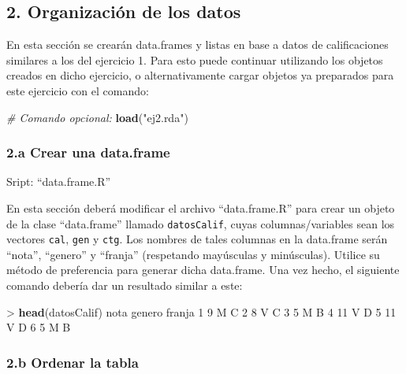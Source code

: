 \documentclass[]{article}
\newenvironment{Shaded}{}{}
\newcommand{\KeywordTok}[1]{\textcolor[rgb]{0.00,0.44,0.13}{\textbf{{#1}}}}
\newcommand{\DecValTok}[1]{\textcolor[rgb]{0.25,0.63,0.44}{{#1}}}
\newcommand{\StringTok}[1]{\textcolor[rgb]{0.25,0.44,0.63}{{#1}}}
\newcommand{\CommentTok}[1]{\textcolor[rgb]{0.38,0.63,0.69}{\textit{{#1}}}}
\newcommand{\NormalTok}[1]{{#1}}
\begin{document}
\subsection{2. Organización de los datos}

En esta sección se crearán data.frames y listas en base a datos de
calificaciones similares a los del ejercicio 1. Para esto puede
continuar utilizando los objetos creados en dicho ejercicio, o
alternativamente cargar objetos ya preparados para este ejercicio con el
comando:

\begin{Shaded}
\begin{Highlighting}[]
\CommentTok{# Comando opcional:}
\KeywordTok{load}\NormalTok{(}\StringTok{"ej2.rda"}\NormalTok{)}
\end{Highlighting}
\end{Shaded}
\subsubsection{2.a Crear una data.frame}

Sript: ``data.frame.R''

En esta sección deberá modificar el archivo ``data.frame.R'' para crear
un objeto de la clase ``data.frame'' llamado \texttt{datosCalif}, cuyas
columnas/variables sean los vectores \texttt{cal}, \texttt{gen} y
\texttt{ctg}. Los nombres de tales columnas en la data.frame serán
``nota'', ``genero'' y ``franja'' (respetando mayúsculas y minúsculas).
Utilice su método de preferencia para generar dicha data.frame. Una vez
hecho, el siguiente comando debería dar un resultado similar a este:

\begin{Shaded}
\begin{Highlighting}[]
\NormalTok{> }\KeywordTok{head}\NormalTok{(datosCalif)}
  \NormalTok{nota genero franja}
\DecValTok{1}    \DecValTok{9}      \NormalTok{M      C}
\DecValTok{2}    \DecValTok{8}      \NormalTok{V      C}
\DecValTok{3}    \DecValTok{5}      \NormalTok{M      B}
\DecValTok{4}   \DecValTok{11}      \NormalTok{V      D}
\DecValTok{5}   \DecValTok{11}      \NormalTok{V      D}
\DecValTok{6}    \DecValTok{5}      \NormalTok{M      B}
\end{Highlighting}
\end{Shaded}
\subsubsection{2.b Ordenar la tabla}
\end{document}
